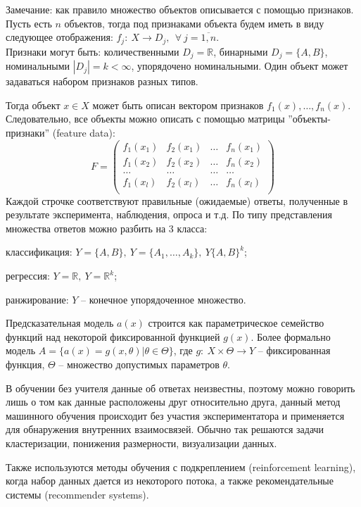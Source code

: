 Замечание: как правило множество объектов описывается с помощью признаков. Пусть есть $n$ объектов, тогда под признаками объекта будем иметь в виду следующее отображения: $f_j:~X \rightarrow D_j,~~\forall~j=\overline{1,n}$.\\
Признаки могут быть: количественными $D_j=\mathbb{R}$, бинарными $D_j=\{A, B\}$, номинальными $|D_j|=k<\infty$, упорядочено номинальными. Один объект может задаваться набором признаков разных типов.

Тогда объект $x \in X$ может быть описан вектором признаков $f_1(x), \dots, f_n(x)$.
Следовательно, все объекты можно описать с помощью матрицы ''объекты-признаки'' (feature data):
$$ F = 
\begin{pmatrix}
f_1(x_1) & f_2(x_1) & \dots & f_n(x_1) \\
f_1(x_2) & f_2(x_2) & \dots & f_n(x_2) \\
\dots    & \dots    & \dots & \dots    \\
f_1(x_l) & f_2(x_l) & \dots & f_n(x_l) \\
\end{pmatrix}
$$
Каждой строчке соответствуют правильные (ожидаемые) ответы, полученные в результате эксперимента, наблюдения, опроса и т.д. По типу представления множества ответов можно разбить на 3 класса:
\begin{description}[font=$\bullet$]
    \item классификация: $Y=\{A,B\},~Y=\{A_1,\dots,A_k\},~Y\{A,B\}^k$;
    \item регрессия: $Y=\mathbb{R},~Y=\mathbb{R}^k$;
    \item ранжирование: $Y$ -- конечное упорядоченное множество.
\end{description}

Предсказательная модель $a(x)$ строится как параметрическое семейство функций над некоторой фиксированной функцией $g(x)$. Более формально модель $A = \{ a(x) = g(x,\theta) | \theta \in \Theta \}$, где $g:~X \times \Theta \rightarrow Y$ -- фиксированная функция, $\Theta$ -- множество допустимых параметров $\theta$.


В обучении без учителя данные об ответах неизвестны, поэтому можно говорить лишь о том как данные расположены друг относительно друга, данный метод машинного обучения происходит без участия экспериментатора и применяется для обнаружения внутренних взаимосвязей. Обычно так решаются задачи кластеризации, понижения размерности, визуализации данных.

Также используются методы обучения с подкреплением (reinforcement learning), когда набор данных дается из некоторого потока, а также рекомендательные системы (recommender systems).

